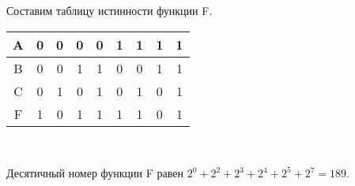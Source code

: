 \documentclass[a4paper,10pt]{report} %
\begin{document}
\newpage
\begin{flushleft}
Составим таблицу истинности функции F. \\

\bigskip

\begin{tabular}{|c|c|c|c|c|c|c|c|c|}
\hline
A &0 &0 &0 &0 &1 &1 &1 &1 \\
\hline
B &0 &0 &1 &1 &0 &0 &1 &1 \\
\hline
C &0 &1 &0 &1 &0 &1 &0 &1 \\
\hline
F &1 & 0 & 1 & 1 & 1 & 1 & 0 & 1\\
\hline
\end{tabular}
\\
\bigskip

Десятичный номер функции F равен $2^0 + 2^2 + 2^3 + 2^4 + 2^5 + 2^7 = 189$.
\end{flushleft}
\end{document}
